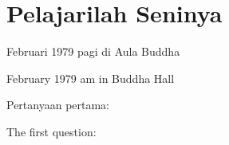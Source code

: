 \chapter{Pelajarilah Seninya} %

 Februari 1979 pagi di Aula Buddha

 February 1979 am in Buddha Hall

\bahasa
Pertanyaan pertama:

\english
The first question:
